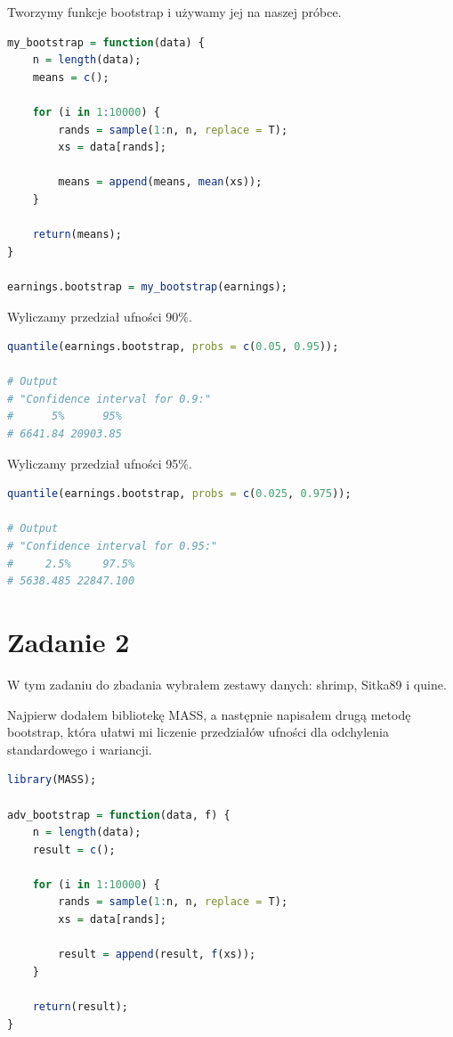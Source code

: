 \documentclass[11pt]{article}
\begin{document}
\pagebreak

Tworzymy funkcje bootstrap i używamy jej na naszej próbce.

\begin{lstlisting}[language=R]
my_bootstrap = function(data) {
    n = length(data);
    means = c();

    for (i in 1:10000) {
        rands = sample(1:n, n, replace = T);
        xs = data[rands];

        means = append(means, mean(xs));
    }

    return(means);
}

earnings.bootstrap = my_bootstrap(earnings);
\end{lstlisting}

Wyliczamy przedział ufności 90\%.

\begin{lstlisting}[language=R]
quantile(earnings.bootstrap, probs = c(0.05, 0.95));

# Output
# "Confidence interval for 0.9:"
#      5%      95% 
# 6641.84 20903.85 
\end{lstlisting}

Wyliczamy przedział ufności 95\%.

\begin{lstlisting}[language=R]
quantile(earnings.bootstrap, probs = c(0.025, 0.975));

# Output
# "Confidence interval for 0.95:"
#     2.5%     97.5% 
# 5638.485 22847.100 
\end{lstlisting}

\pagebreak

\section{Zadanie 2}
W tym zadaniu do zbadania wybrałem zestawy danych: shrimp, Sitka89 i quine.

Najpierw dodałem bibliotekę MASS, a następnie napisałem drugą metodę bootstrap,
która ułatwi mi liczenie przedziałów ufności dla odchylenia standardowego i wariancji.

\begin{lstlisting}[language=R]
library(MASS);

adv_bootstrap = function(data, f) {
    n = length(data);
    result = c();

    for (i in 1:10000) {
        rands = sample(1:n, n, replace = T);
        xs = data[rands];

        result = append(result, f(xs));
    }

    return(result);
}
\end{lstlisting}
\end{document}
